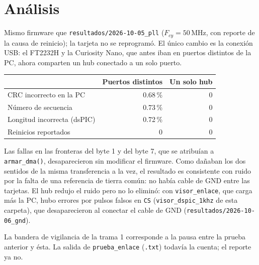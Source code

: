 \section{Análisis}

Mismo firmware que \texttt{resultados/2026-10-05\_pll} ($F_{cy} = 50$\,MHz,
con reporte de la causa de reinicio); la tarjeta no se reprogramó. El único
cambio es la conexión USB: el FT2232H y la Curiosity Nano, que antes iban en
puertos distintos de la PC, ahora comparten un hub conectado a un solo
puerto.

\begin{table}[H]
\centering
\begin{tabular}{@{}lrr@{}}
\toprule
 & Puertos distintos & Un solo hub \\
\midrule
CRC incorrecto en la PC        & 0.68\,\% & 0 \\
Número de secuencia            & 0.73\,\% & 0 \\
Longitud incorrecta (dsPIC)    & 0.72\,\% & 0 \\
Reinicios reportados           & 0        & 0 \\
\bottomrule
\end{tabular}
\end{table}

Las fallas en las fronteras del byte 1 y del byte 7, que se atribuían a
\texttt{armar\_dma()}, desaparecieron sin modificar el firmware. Como dañaban
los dos sentidos de la misma transferencia a la vez, el resultado es
consistente con ruido por la falta de una referencia de tierra común: no
había cable de GND entre las tarjetas. El hub redujo el ruido pero no lo
eliminó: con \texttt{visor\_enlace}, que carga más la PC, hubo errores por
pulsos falsos en \texttt{CS} (\texttt{visor\_dspic\_1khz} de esta
carpeta), que desaparecieron al conectar el cable de GND
(\texttt{resultados/2026-10-06\_gnd}).

La bandera de vigilancia de la trama 1 corresponde a la pausa entre la
prueba anterior y ésta. La salida de \texttt{prueba\_enlace} (\texttt{.txt})
todavía la cuenta; el reporte ya no.
